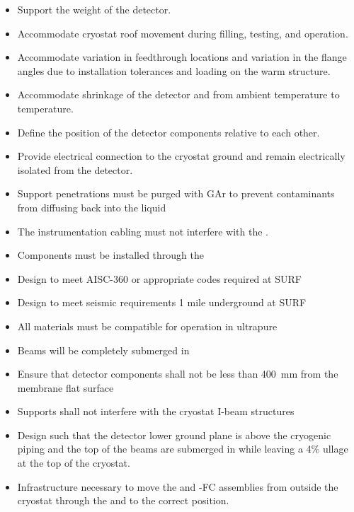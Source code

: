 \begin{itemize}
 \setlength\itemsep{1mm}
\setlength{\parsep}{1mm}
\setlength{\itemsep}{-5mm}
\item Support the weight of the detector.
\item Accommodate cryostat roof movement during filling, testing, and operation.
\item Accommodate variation in feedthrough locations and
  variation in the flange angles due to installation tolerances and
  loading on the warm structure.
\item Accommodate shrinkage of the detector and  from ambient
  temperature to  temperature.
\item Define the position of the detector components relative to each other. 
\item Provide electrical connection to the cryostat ground and remain electrically isolated from the detector.
\item Support penetrations must be purged with GAr to prevent contaminants from diffusing back into the liquid
\item The instrumentation cabling must not interfere with the .
\item Components must be installed through the 
\item Design to meet AISC-360 or appropriate codes required at SURF
\item Design to meet seismic requirements 1 mile underground at SURF
\item All materials must be compatible for operation in ultrapure 
\item Beams will be completely submerged in 
\item Ensure that detector components shall not be less than \SI{400}{mm} from the membrane flat surface
\item Supports shall not interfere with the cryostat I-beam structures
\item Design such that the detector lower ground plane is above the cryogenic piping and the top of the  beams are submerged in  while leaving a 4\% ullage at the top of the cryostat.
\item Infrastructure necessary to move the  and
  -FC assemblies from outside the cryostat through the
   and to the correct position.
\end{itemize}

